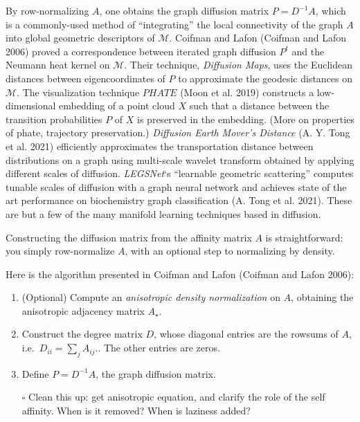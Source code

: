\documentclass[
  letterpaper,
  DIV=11,
  numbers=noendperiod]{scrartcl}
\providecommand{\tightlist}{%
  \setlength{\itemsep}{0pt}\setlength{\parskip}{0pt}}\usepackage{longtable,booktabs,array}
\theoremstyle{plain}
\theoremstyle{plain}
\theoremstyle{definition}
\theoremstyle{plain}
\theoremstyle{definition}
\theoremstyle{plain}
\theoremstyle{remark}
\begin{document}
By row-normalizing \(A\), one obtains the graph diffusion matrix
\(P = D^{-1}A\), which is a commonly-used method of ``integrating'' the
local connectivity of the graph \(A\) into global geometric descriptors
of \(\mathcal{M}\). Coifman and Lafon (Coifman and Lafon 2006) proved a
correspondence between iterated graph diffusion \(P^t\) and the Neumann
heat kernel on \(\mathcal{M}\). Their technique, \emph{Diffusion Maps},
uses the Euclidean distances between eigencoordinates of \(P\) to
approximate the geodesic distances on \(\mathcal{M}\). The visualization
technique \(PHATE\) (Moon et al. 2019) constructs a low-dimensional
embedding of a point cloud \(X\) such that a distance between the
transition probabilities \(P\) of \(X\) is preserved in the embedding.
(More on properties of phate, trajectory preservation.) \emph{Diffusion
Earth Mover's Distance} (A. Y. Tong et al. 2021) efficiently
approximates the transportation distance between distributions on a
graph using multi-scale wavelet transform obtained by applying different
scales of diffusion. \emph{LEGSNet}`s ``learnable geometric scattering''
computes tunable scales of diffusion with a graph neural network and
achieves state of the art performance on biochemistry graph
classification (A. Tong et al. 2021). These are but a few of the many
manifold learning techniques based in diffusion.

Constructing the diffusion matrix from the affinity matrix \(A\) is
straightforward: you simply row-normalize \(A\), with an optional step
to normalizing by density.

Here is the algorithm presented in Coifman and Lafon (Coifman and Lafon
2006):

\begin{enumerate}
\def\labelenumi{\arabic{enumi}.}
\tightlist
\item
  (Optional) Compute an \emph{anisotropic density normalization} on
  \(A\), obtaining the anisotropic adjacency matrix \(A_{\star}\).
\item
  Construct the degree matrix \(D\), whose diagonal entries are the
  rowsums of \(A\), i.e.~\(D_{ii} = \sum_{j}A_{ij}\).. The other entries
  are zeros.
\item
  Define \(P = D^{-1} A\), the graph diffusion matrix.
\end{enumerate}

\begin{itemize}
\tightlist
\item[$\square$]
  Clean this up: get anisotropic equation, and clarify the role of the
  self affinity. When is it removed? When is laziness added?
\end{itemize}
\end{document}
